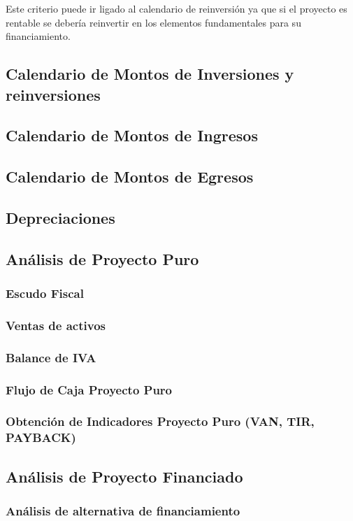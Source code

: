             Este criterio puede ir ligado al calendario de reinversión
            ya que si el proyecto es rentable se debería reinvertir en los
            elementos fundamentales para su financiamiento.
        
    \subsection{Calendario de Montos de Inversiones y reinversiones}
    \subsection{Calendario de Montos de Ingresos}
    \subsection{Calendario de Montos de Egresos}
    \subsection{Depreciaciones}
    \subsection{Análisis de Proyecto Puro}
    	\subsubsection{Escudo Fiscal}
    	\subsubsection{Ventas de activos}
    	\subsubsection{Balance de IVA}
    	\subsubsection{Flujo de Caja Proyecto Puro}
    	\subsubsection{Obtención de Indicadores Proyecto Puro (VAN, TIR, PAYBACK)}
    \subsection{Análisis de Proyecto Financiado}
    	\subsubsection{Análisis de alternativa de financiamiento}
